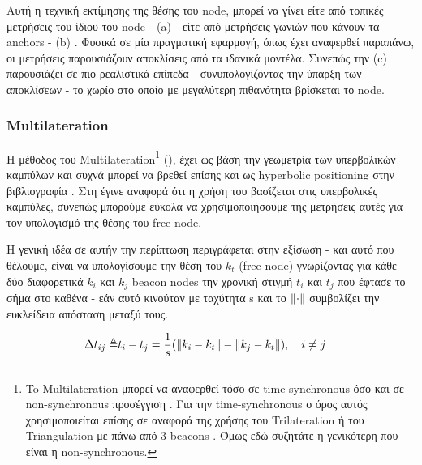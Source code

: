 Αυτή η τεχνική εκτίμησης της θέσης του node, μπορεί να γίνει είτε από τοπικές μετρήσεις του ίδιου του node -
 (a) - είτε από μετρήσεις γωνιών που κάνουν τα anchors -  (b)
\cite{wsn-Localization-systems}. Φυσικά σε μία πραγματική εφαρμογή, όπως έχει αναφερθεί παραπάνω, οι μετρήσεις παρουσιάζουν αποκλίσεις 
από τα ιδανικά μοντέλα. Συνεπώς την  (c) παρουσιάζει σε πιο ρεαλιστικά επίπεδα - συνυπολογίζοντας την ύπαρξη 
των αποκλίσεων - 
το χωρίο στο οποίο με μεγαλύτερη πιθανότητα βρίσκεται το node.

\subsubsection{Multilateration} \label{sec:Multilateration}
Η μέθοδος του Multilateration\footnote{To Multilateration μπορεί να αναφερθεί τόσο σε time-synchronous όσο και σε non-synchronous προσέγγιση \cite{multilateration-based-on-timing}. Για την time-synchronous ο όρος αυτός χρησιμοποιείται επίσης σε αναφορά της χρήσης του Trilateration ή του Triangulation με πάνω από 3 beacons \cite{wsn-Localization-systems} \cite{triangulation-simple-equation}. Όμως εδώ συζητάτε η γενικότερη που είναι  η non-synchronous.} (), 
έχει ως βάση την γεωμετρία των υπερβολικών καμπύλων και συχνά μπορεί να βρεθεί επίσης και ως hyperbolic positioning 
στην βιβλιογραφία \cite{multilateration-def} \cite{triangulation-trilateration-multilateration} \cite{wikipedia-multilateration}. Στη  
έγινε αναφορά ότι η χρήση του  βασίζεται στις υπερβολικές καμπύλες, συνεπώς μπορούμε εύκολα να χρησιμοποιήσουμε
της μετρήσεις αυτές για τον υπολογισμό της θέσης του free node.

Η γενική ιδέα σε αυτήν την περίπτωση περιγράφεται στην εξίσωση  \cite{wsn-Localization-techniques} \cite{simple-tdoa} - και αυτό που 
θέλουμε, είναι να υπολογίσουμε την θέση του $k_t$ (free node) γνωρίζοντας για κάθε δύο διαφορετικά $k_i$ και $k_j$ beacon nodes
την χρονική στιγμή $t_i$ και $t_j$ που έφτασε το σήμα στο καθένα - εάν αυτό κινούταν με ταχύτητα s και το $\left\lVert\cdot\right\rVert$ συμβολίζει την ευκλείδεια
απόσταση μεταξύ τους.

\begin{align}
	\Delta t_{ij} \triangleq & t_i - t_j = \frac{1}{s} (\left\lVert k_i - k_t\right\rVert - \left\lVert k_j - k_t\right\rVert), \quad i \neq j\label{eq:tdoa-multiple}
\end{align}

